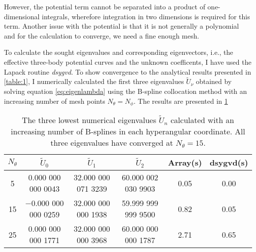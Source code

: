 However, the potential term cannot be separated into a product of one-dimensional integrals, wherefore integration in two dimensions is required for this term. Another issue with the potential is that it is not generally a polynomial and for the calculation to converge, we need a fine enough mesh. 

To calculate the sought eigenvalues and corresponding eigenvectors, i.e., the effective three-body potential curves and the unknown coefficents, I have used the Lapack routine \textit{dsygvd}. To show convergence to the analytical results presented in \cref{table:1}, I numerically calculated the first three eigenvalues $\tilde{U}_{\nu}$ obtained by solving equation \eqref{eq:eigenlambda} using the B-spline collocation method with an increasing number of mesh points $N_{\theta}=N_{\phi}$. The results are presented in \cref{table:2} 

\begin{table}[h!]
	\centering
	\footnotesize
	\begin{adjustwidth}{-0.1cm}{}
	\tabcolsep=0.10cm
	\begin{tabular}{||c c c c c c||} 
		\hline
		$N_{\theta}$ & $\tilde{U}_0$ & $\tilde{U}_1$ & $\tilde{U}_2$ &  Array(s) & dsygvd(s)
		\Tstrut\Bstrut \\ [0.7ex]
		\hline\hline
		5	   & 0.000 000 000 0043   & 32.000 000 071 3239 & 60.000 002 030 9903 & 0.05 & 0.00  \\
		15     & $-$0.000 000 000 0259 & 32.000 000 000 1938 & 59.999 999 999 9500  & 0.82 & 0.05 \\
		25 & 0.000 000 000 1771 & 32.000 000 000 3968 & 60.000 000 000 1787& 2.71& 0.65 \\ [1ex] 
		\hline
	\end{tabular}
	\end{adjustwidth}
	\caption{The three lowest numerical eigenvalues $\tilde{U}_n$ calculated with an increasing number of B-splines in each hyperangular coordinate. All three eigenvalues have converged at $N_{\theta}=15$.}
	\label{table:2}
\end{table}
